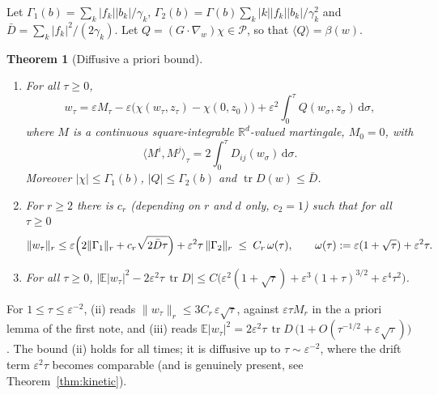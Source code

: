 \documentclass[11pt]{article}
\newcommand{\dd}{\mathrm{d}}
\newcommand{\E}{\mathbb{E}}
\newcommand{\eps}{\varepsilon}
\newcommand{\cP}{\mathcal{P}}
\newcommand{\nrm}[2]{\|#1\|_{#2}}
\newcommand{\avg}[1]{\langle #1\rangle}
\newcommand{\tr}{\operatorname{tr}}
\newtheorem{theorem}{Theorem}
\theoremstyle{remark}
\begin{document}
Let $\Gamma_1(b) = \sum_k|f_k||b_k|/\gamma_k$,
$\Gamma_2(b) = \Gamma(b)\sum_k|k||f_k||b_k|/\gamma_k^2$ and
$\bar D = \sum_k|f_k|^2/(2\gamma_k)$. Let
$Q = (G\cdot\nabla_w)\chi\in\cP$, so that $\avg Q = \beta(w)$.

\begin{theorem}[Diffusive a priori bound]\label{thm:apriori}
\begin{enumerate}
\item[(i)] For all $\tau\ge0$,
\begin{equation}
  w_\tau = \eps M_\tau - \eps\bigl(\chi(w_\tau,z_\tau) - \chi(0,z_0)\bigr)
    + \eps^2\int_0^\tau Q(w_\sigma,z_\sigma)\,\dd\sigma ,
  \label{eq:decomp}
\end{equation}
where $M$ is a continuous square-integrable $\mathbb{R}^d$-valued martingale,
$M_0=0$, with
\begin{equation}
  \langle M^i,M^j\rangle_\tau = 2\int_0^\tau D_{ij}(w_\sigma)\,\dd\sigma .
  \label{eq:bracket}
\end{equation}
Moreover $|\chi|\le\Gamma_1(b)$, $|Q|\le\Gamma_2(b)$ and $\tr D(w)\le\bar D$.
\item[(ii)] For $r\ge2$ there is $c_r$ (depending on $r$ and $d$ only,
$c_2=1$) such that for all $\tau\ge0$
\begin{equation}
  \nrm{w_\tau}{r}\le\eps\Bigl(2\nrm{\Gamma_1}{r} + c_r\sqrt{2\bar D\tau}\Bigr)
     + \eps^2\tau\,\nrm{\Gamma_2}{r}
  \;\le\; C_r\,\omega(\tau),\qquad
  \omega(\tau) := \eps(1+\sqrt\tau) + \eps^2\tau .
  \label{eq:apriori}
\end{equation}
\item[(iii)] For all $\tau\ge0$,
$\bigl|\E|w_\tau|^2 - 2\eps^2\tau\,\tr D\bigr|
  \le C\bigl(\eps^2(1+\sqrt\tau) + \eps^3(1+\tau)^{3/2} + \eps^4\tau^2\bigr)$.
\end{enumerate}
\end{theorem}

For $1\le\tau\le\eps^{-2}$, (ii) reads $\nrm{w_\tau}{r}\le3C_r\,\eps\sqrt\tau$,
against $\eps\tau M_r$ in the a priori lemma of the first note, and (iii) reads
$\E|w_\tau|^2 = 2\eps^2\tau\,\tr D\,\bigl(1 + O(\tau^{-1/2} + \eps\sqrt\tau)\bigr)$.
The bound (ii) holds for all times; it is diffusive up to $\tau\sim\eps^{-2}$,
where the drift term $\eps^2\tau$ becomes comparable (and is genuinely
present, see Theorem~\ref{thm:kinetic}).
\end{document}
